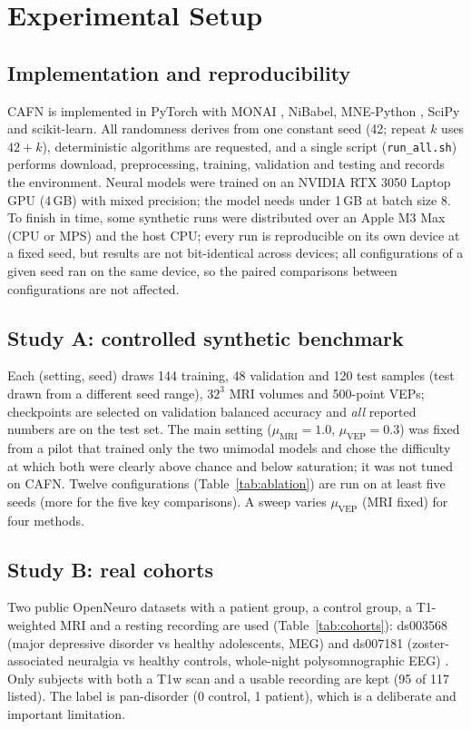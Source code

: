 \section{Experimental Setup}\label{sec:setup}
\subsection{Implementation and reproducibility}
CAFN is implemented in PyTorch \cite{paszke2019} with MONAI \cite{cardoso2022}, NiBabel, MNE-Python \cite{gramfort2013}, SciPy \cite{virtanen2020} and scikit-learn. All randomness derives from one constant seed (42; repeat $k$ uses $42{+}k$), deterministic algorithms are requested, and a single script (\texttt{run\_all.sh}) performs download, preprocessing, training, validation and testing and records the environment. Neural models were trained on an NVIDIA RTX 3050 Laptop GPU (4\,GB) with mixed precision; the model needs under 1\,GB at batch size 8. To finish in time, some synthetic runs were distributed over an Apple M3 Max (CPU or MPS) and the host CPU; every run is reproducible on its own device at a fixed seed, but results are not bit-identical across devices; all configurations of a given seed ran on the same device, so the paired comparisons between configurations are not affected.

\subsection{Study A: controlled synthetic benchmark}
Each (setting, seed) draws 144 training, 48 validation and 120 test samples (test drawn from a different seed range), $32^3$ MRI volumes and 500-point VEPs; checkpoints are selected on validation balanced accuracy and \emph{all} reported numbers are on the test set. The main setting ($\mu_{\mathrm{MRI}}=1.0$, $\mu_{\mathrm{VEP}}=0.3$) was fixed from a pilot that trained only the two unimodal models and chose the difficulty at which both were clearly above chance and below saturation; it was not tuned on CAFN. Twelve configurations (Table~\ref{tab:ablation}) are run on at least five seeds (more for the five key comparisons). A sweep varies $\mu_{\mathrm{VEP}}$ (MRI fixed) for four methods.

\subsection{Study B: real cohorts}
Two public OpenNeuro datasets with a patient group, a control group, a T1-weighted MRI and a resting recording are used (Table~\ref{tab:cohorts}): ds003568 (major depressive disorder vs healthy adolescents, MEG) \cite{liuzzi2022ds003568} and ds007181 (zoster-associated neuralgia vs healthy controls, whole-night polysomnographic EEG) \cite{ds007181}. Only subjects with both a T1w scan and a usable recording are kept (95 of 117 listed). The label is pan-disorder (0 control, 1 patient), which is a deliberate and important limitation.

